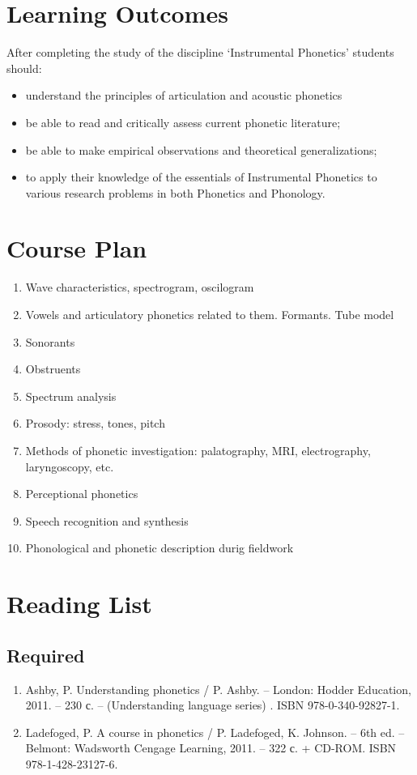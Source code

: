 \documentclass[a4paper]{article}
\begin{document}
\section{Learning Outcomes}
\noindent After completing the study of the discipline `Instrumental Phonetics' students should:
\begin{itemize}
\item understand the principles of articulation and acoustic phonetics
\item be able to read and critically assess current phonetic literature;
\item be able to make empirical observations and theoretical generalizations;
\item to apply their knowledge of the essentials of Instrumental Phonetics to various research problems in both Phonetics and Phonology. 
\end{itemize}

\section{Course Plan}
\begin{enumerate}
\item Wave characteristics, spectrogram, oscilogram
\item Vowels and articulatory phonetics related to them. Formants. Tube model
\item Sonorants
\item Obstruents
\item Spectrum analysis
\item Prosody: stress, tones, pitch
\item Methods of phonetic investigation: palatography, MRI, electrography, laryngoscopy, etc.
\item Perceptional phonetics
\item Speech recognition and synthesis
\item Phonological and phonetic description durig fieldwork
\end{enumerate}
\section{Reading List}
\subsection{Required}
\begin{enumerate}
\item  Ashby, P. Understanding phonetics / P. Ashby. – London: Hodder Education, 2011. – 230 с. – (Understanding language series) .  ISBN 978-0-340-92827-1.
\item  Ladefoged, P. A course in phonetics / P. Ladefoged, K. Johnson. – 6th ed. – Belmont: Wadsworth Cengage Learning, 2011. – 322 с. + CD-ROM.  ISBN 978-1-428-23127-6.
\end{enumerate}
\end{document}
